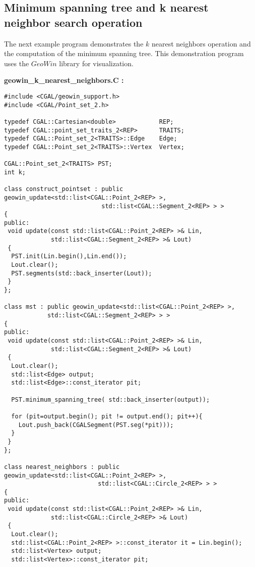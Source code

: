 \ccHtmlLinksOn


\subsection{Minimum spanning tree and k nearest neighbor search operation}

The next example program demonstrates the $k$ nearest neighbors operation
and the computation of the minimum spanning tree.
This demonstration program uses the $GeoWin$ library for visualization.


\ccHtmlLinksOff

{\bf geowin\_k\_nearest\_neighbors.C :}
\begin{verbatim}
#include <CGAL/geowin_support.h>
#include <CGAL/Point_set_2.h>

typedef CGAL::Cartesian<double>            REP;
typedef CGAL::point_set_traits_2<REP>      TRAITS;
typedef CGAL::Point_set_2<TRAITS>::Edge    Edge;
typedef CGAL::Point_set_2<TRAITS>::Vertex  Vertex;

CGAL::Point_set_2<TRAITS> PST;
int k;

class construct_pointset : public geowin_update<std::list<CGAL::Point_2<REP> >,
                           std::list<CGAL::Segment_2<REP> > >
{
public:
 void update(const std::list<CGAL::Point_2<REP> >& Lin, 
             std::list<CGAL::Segment_2<REP> >& Lout)
 {
  PST.init(Lin.begin(),Lin.end());
  Lout.clear();
  PST.segments(std::back_inserter(Lout));
 }
};

class mst : public geowin_update<std::list<CGAL::Point_2<REP> >, 
            std::list<CGAL::Segment_2<REP> > >
{
public:
 void update(const std::list<CGAL::Point_2<REP> >& Lin,
             std::list<CGAL::Segment_2<REP> >& Lout)
 {
  Lout.clear();
  std::list<Edge> output;  
  std::list<Edge>::const_iterator pit;
  
  PST.minimum_spanning_tree( std::back_inserter(output));  
  
  for (pit=output.begin(); pit != output.end(); pit++){
    Lout.push_back(CGALSegment(PST.seg(*pit)));
  } 
 }
};

class nearest_neighbors : public geowin_update<std::list<CGAL::Point_2<REP> >, 
                          std::list<CGAL::Circle_2<REP> > >
{
public:
 void update(const std::list<CGAL::Point_2<REP> >& Lin, 
             std::list<CGAL::Circle_2<REP> >& Lout)
 {
  Lout.clear();
  std::list<CGAL::Point_2<REP> >::const_iterator it = Lin.begin();
  std::list<Vertex> output;  
  std::list<Vertex>::const_iterator pit;


\end{verbatim}
